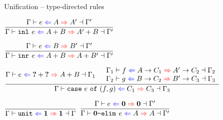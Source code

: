 \documentclass{beamer}
\begin{document}
\begin{frame}{Unification -- type-directed rules}

\begin{center}
  $\infrule{\uniftyping{e}{A}{A'}}{\uniftyping{\inl{e}}{\Sum{A}{B}}{\Sum{A'}{B}}}$

  \vspace{2em}

  $\infrule{\uniftyping{e}{B}{B'}}{\uniftyping{\inr{e}}{\Sum{A}{B}}{\Sum{A}{B'}}}$

  \vspace{2em}

  $\infrule{\uniftyping[\Gamma]{e}{\Sum{\Hole}{\Hole}}{\Sum{A}{B}}[\Gamma_1] \quad \begin{array}{c} \uniftyping[\Gamma_1]{f}{\Fun{A}{C_1}}{\Fun{A'}{C_2}}[\Gamma_2] \\ \uniftyping[\Gamma_2]{g}{\Fun{B}{C_2}}{\Fun{B'}{C_3}}[\Gamma_3] \end{array}}{\uniftyping[\Gamma]{\case{e}{f}{g}}{C_1}{C_3}[\Gamma_3]}$

  \vspace{2em}

  $\infrule{}{\uniftyping[\Gamma]{\unit}{\Unit}{\Unit}[\Gamma]}$
  \quad
  $\infrule{\uniftyping{e}{\Empty}{\Empty}}{\uniftyping{\emptyelim{e}}{A}{A}}$
\end{center}

\end{frame}
\end{document}
